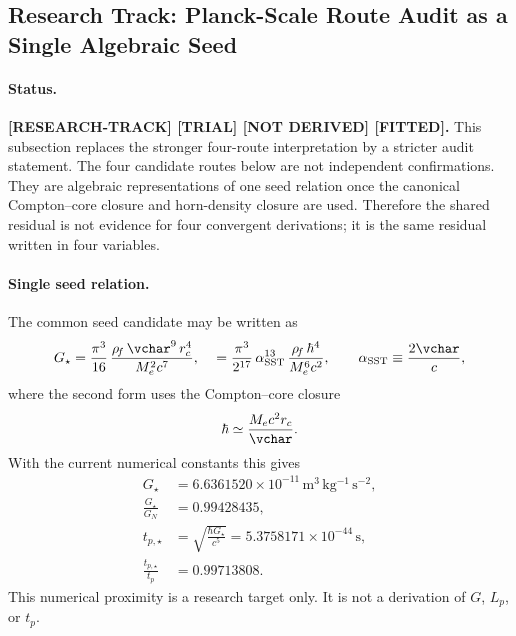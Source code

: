 

\subsection{Research Track: Planck-Scale Route Audit as a Single Algebraic Seed}
\label{subsec:rt_planck_routes_single_seed_audit}

\paragraph{Status.}
\textbf{[RESEARCH-TRACK] [TRIAL] [NOT DERIVED] [FITTED].}
This subsection replaces the stronger four-route interpretation by a stricter
audit statement.  The four candidate routes below are not independent
confirmations.  They are algebraic representations of one seed relation once the
canonical Compton--core closure and horn-density closure are used.  Therefore
the shared residual is not evidence for four convergent derivations; it is the
same residual written in four variables.

\paragraph{Single seed relation.}
The common seed candidate may be written as
\begin{align}
    G_{\star}
    &=
    \frac{\pi^3}{16}\,
    \frac{\rho_{\!f}\,\vchar^{9}\,r_c^4}{M_e^2 c^7},
    \label{eq:rt_planck_seed_G}\
    &=
    \frac{\pi^3}{2^{17}}\,
    \alpha_{\rm SST}^{13}\,
    \frac{\rho_{\!f}\,\hbar^4}{M_e^6c^2},
    \qquad
    \alpha_{\rm SST}\equiv\frac{2\vchar}{c},
    \label{eq:rt_planck_seed_alpha_form}
\end{align}
where the second form uses the Compton--core closure
\begin{align}
    \hbar
    \simeq
    \frac{M_ec^2r_c}{\vchar}.
\end{align}
With the current numerical constants this gives
\begin{align}
    G_{\star}
    &=
    6.6361520\times10^{-11}\,
    \mathrm{m^3\,kg^{-1}\,s^{-2}},
    \\
    \frac{G_{\star}}{G_N}
    &=
    0.99428435,
    \\
    t_{p,\star}
    &=
    \sqrt{\frac{\hbar G_{\star}}{c^5}}
    =
    5.3758171\times10^{-44}\,\mathrm{s},
    \\
    \frac{t_{p,\star}}{t_p}
    &=
    0.99713808.
\end{align}
This numerical proximity is a research target only.  It is not a derivation of
\(G\), \(L_p\), or \(t_p\).

